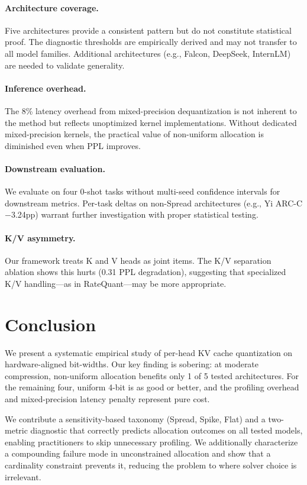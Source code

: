 \documentclass[11pt,a4paper]{article}
\begin{document}
\paragraph{Architecture coverage.}
Five architectures provide a consistent pattern but do not constitute statistical proof.
The diagnostic thresholds are empirically derived and may not transfer to all model families.
Additional architectures (e.g., Falcon, DeepSeek, InternLM) are needed to validate generality.

\paragraph{Inference overhead.}
The 8\% latency overhead from mixed-precision dequantization is not inherent to the method but reflects unoptimized kernel implementations.
Without dedicated mixed-precision kernels, the practical value of non-uniform allocation is diminished even when PPL improves.

\paragraph{Downstream evaluation.}
We evaluate on four 0-shot tasks without multi-seed confidence intervals for downstream metrics.
Per-task deltas on non-Spread architectures (e.g., Yi ARC-C $-$3.24pp) warrant further investigation with proper statistical testing.

\paragraph{K/V asymmetry.}
Our framework treats K and V heads as joint items.
The K/V separation ablation shows this hurts (0.31 PPL degradation), suggesting that specialized K/V handling---as in RateQuant---may be more appropriate.

\section{Conclusion}

We present a systematic empirical study of per-head KV cache quantization on hardware-aligned bit-widths.
Our key finding is sobering: at moderate compression, non-uniform allocation benefits only 1 of 5 tested architectures.
For the remaining four, uniform 4-bit is as good or better, and the profiling overhead and mixed-precision latency penalty represent pure cost.

We contribute a sensitivity-based taxonomy (Spread, Spike, Flat) and a two-metric diagnostic that correctly predicts allocation outcomes on all tested models, enabling practitioners to skip unnecessary profiling.
We additionally characterize a compounding failure mode in unconstrained allocation and show that a cardinality constraint prevents it, reducing the problem to where solver choice is irrelevant.
\end{document}
